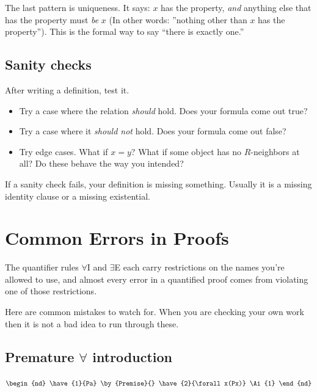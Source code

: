 \documentclass[11pt]{article}
\begin{document}
The last pattern is uniqueness. It says: $x$ has the property, \emph{and} anything else that has the property must \emph{be} $x$ (In other words: ''nothing other than $x$ has the property''). This is the formal way to say ``there is exactly one.''

\subsection{Sanity checks}

After writing a definition, test it.

\begin{itemize}[leftmargin=*]
    \item Try a case where the relation \emph{should} hold. Does your formula come out true?
    \item Try a case where it \emph{should not} hold. Does your formula come out false?
    \item Try edge cases. What if $x = y$? What if some object has no $R$-neighbors at all? Do these behave the way you intended?
\end{itemize}

If a sanity check fails, your definition is missing something. Usually it is a missing identity clause or a missing existential.

\section{Common Errors in Proofs}

The quantifier rules $\forall$I and $\exists$E each carry restrictions on the names you're allowed to use, and almost every error in a quantified proof comes from violating one of those restrictions.

 Here are common mistakes to watch for. When you are checking your own work then it is not a bad idea to run through these.

\subsection{Premature $\forall$ introduction}

\begin{warnbox}
\begin{center}
    $\begin{nd}
       \have{1}{Pa} \by{Premise}{}
       \have{2}{\forall x(Px)} \Ai{1}
    \end{nd}$
\end{center}
\end{warnbox}
\end{document}
